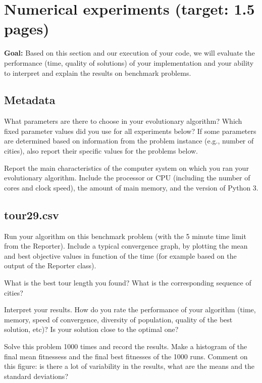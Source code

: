 \documentclass[a4paper,10pt]{article}
\newcommand{\ReplaceMe}[1]{{\color{blue}#1}}
\newcommand{\RemoveMe}[1]{{\color{purple}#1}}
\begin{document}
\section{Numerical experiments (target: 1.5 pages)}

\RemoveMe{\textbf{Goal:} Based on this section and our execution of your code, we will evaluate the performance (time, quality of solutions) of your implementation and your ability to interpret and explain the results on benchmark problems.}

\subsection{Metadata}

\ReplaceMe{What parameters are there to choose in your evolutionary algorithm? Which fixed parameter values did you use for all experiments below? If some parameters are determined based on information from the problem instance (e.g., number of cities), also report their specific values for the problems below.

Report the main characteristics of the computer system on which you ran your evolutionary algorithm. Include the processor or CPU (including the number of cores and clock speed), the amount of main memory, and the version of Python 3.}


\subsection{tour29.csv}

\ReplaceMe{Run your algorithm on this benchmark problem (with the 5 minute time limit from the Reporter). Include a typical convergence graph, by plotting the mean and best objective values in function of the time (for example based on the output of the Reporter class). 

What is the best tour length you found? What is the corresponding sequence of cities? 

Interpret your results. How do you rate the performance of your algorithm (time, memory, speed of convergence, diversity of population, quality of the best solution, etc)? Is your solution close to the optimal one?

Solve this problem 1000 times and record the results. Make a histogram of the final mean fitnessess and the final best fitnesses of the 1000 runs. Comment on this figure: is there a lot of variability in the results, what are the means and the standard deviations?}
\end{document}
